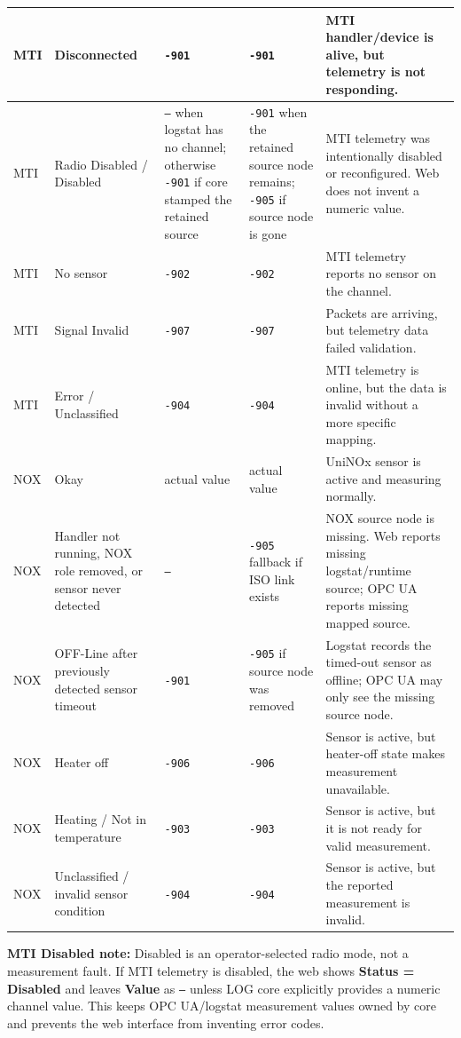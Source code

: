 \documentclass[11pt,a4paper]{article}
\begin{document}
\begin{longtable}{|p{}|p{}|p{}|p{}|p{}|}
\hline
MTI & Disconnected & \texttt{-901} & \texttt{-901} & MTI handler/device is alive, but telemetry is not responding. \\
\hline
MTI & Radio Disabled / Disabled & \texttt{---} when logstat has no channel; otherwise \texttt{-901} if core stamped the retained source & \texttt{-901} when the retained source node remains; \texttt{-905} if source node is gone & MTI telemetry was intentionally disabled or reconfigured. Web does not invent a numeric value. \\
\hline
MTI & No sensor & \texttt{-902} & \texttt{-902} & MTI telemetry reports no sensor on the channel. \\
\hline
MTI & Signal Invalid & \texttt{-907} & \texttt{-907} & Packets are arriving, but telemetry data failed validation. \\
\hline
MTI & Error / Unclassified & \texttt{-904} & \texttt{-904} & MTI telemetry is online, but the data is invalid without a more specific mapping. \\
\hline
NOX & Okay & actual value & actual value & UniNOx sensor is active and measuring normally. \\
\hline
NOX & Handler not running, NOX role removed, or sensor never detected & \texttt{---} & \texttt{-905} fallback if ISO link exists & NOX source node is missing. Web reports missing logstat/runtime source; OPC UA reports missing mapped source. \\
\hline
NOX & OFF-Line after previously detected sensor timeout & \texttt{-901} & \texttt{-905} if source node was removed & Logstat records the timed-out sensor as offline; OPC UA may only see the missing source node. \\
\hline
NOX & Heater off & \texttt{-906} & \texttt{-906} & Sensor is active, but heater-off state makes measurement unavailable. \\
\hline
NOX & Heating / Not in temperature & \texttt{-903} & \texttt{-903} & Sensor is active, but it is not ready for valid measurement. \\
\hline
NOX & Unclassified / invalid sensor condition & \texttt{-904} & \texttt{-904} & Sensor is active, but the reported measurement is invalid. \\
\hline
\end{longtable}
\endgroup

\textbf{MTI Disabled note:} Disabled is an operator-selected radio mode, not a measurement fault. If MTI telemetry is disabled, the web shows \textbf{Status = Disabled} and leaves \textbf{Value} as \texttt{---} unless LOG core explicitly provides a numeric channel value. This keeps OPC UA/logstat measurement values owned by core and prevents the web interface from inventing error codes.
\end{document}
